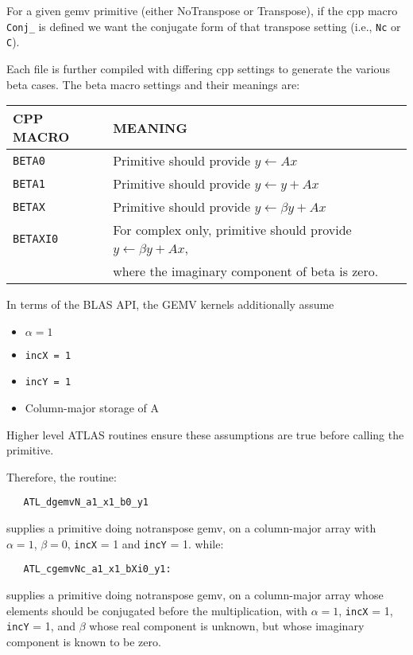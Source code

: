 \documentclass[11pt]{article}
\begin{document}
{For a given gemv primitive (either NoTranspose or Transpose), if the cpp macro
\verb+Conj_+
is defined we want the conjugate form of that transpose setting
(i.e., {\tt Nc} or {\tt C}).

Each file is further compiled with differing cpp settings to generate the
various beta cases.  The beta macro settings and their meanings are:

\begin{tabular}{||l|l||}\hline\hline
CPP MACRO & MEANING \\\hline\hline
{\tt BETA0}   & Primitive should provide $y \leftarrow A  x$ \\\hline
{\tt BETA1}   & Primitive should provide $y \leftarrow y + A x$ \\\hline
{\tt BETAX}   & Primitive should provide $y \leftarrow \beta y + A  x$ \\\hline
{\tt BETAXI0} & For complex only, primitive should provide $y \leftarrow \beta y + A x$, \\
        & where the imaginary component of beta is zero. \\\hline\hline
\end{tabular}

In terms of the BLAS API, the GEMV kernels additionally assume
\begin{itemize}
 \item $\alpha = 1$
 \item \verb+incX = 1+
 \item \verb+incY = 1+
 \item Column-major storage of A
\end{itemize}

Higher level ATLAS routines ensure these assumptions are true before calling
the primitive.

Therefore, the routine:
\begin{verbatim}
   ATL_dgemvN_a1_x1_b0_y1
\end{verbatim}
supplies a primitive doing notranspose gemv, on a column-major array with
$\alpha=1$, $\beta=0$, {\tt incX} = 1 and {\tt incY} = 1.  while:
\begin{verbatim}
   ATL_cgemvNc_a1_x1_bXi0_y1:
\end{verbatim}
supplies a primitive doing notranspose gemv, on a column-major array whose
elements should be conjugated before the multiplication, with
$\alpha=1$, {\tt incX} = 1, {\tt incY} = 1, and $\beta$ whose real component
is unknown, but whose imaginary component is known to be zero.

}
\end{document}

